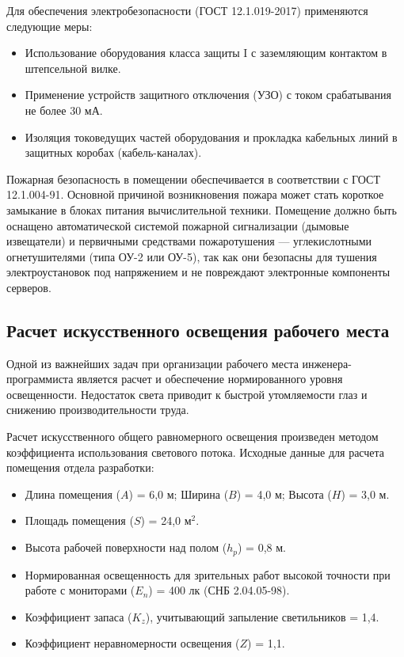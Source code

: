 Для обеспечения электробезопасности (ГОСТ 12.1.019-2017) применяются следующие меры:
\begin{itemize}
    \item Использование оборудования класса защиты I с заземляющим контактом в штепсельной вилке.
    \item Применение устройств защитного отключения (УЗО) с током срабатывания не более 30 мА.
    \item Изоляция токоведущих частей оборудования и прокладка кабельных линий в защитных коробах (кабель-каналах).
\end{itemize}

Пожарная безопасность в помещении обеспечивается в соответствии с ГОСТ 12.1.004-91. Основной причиной возникновения пожара может стать короткое замыкание в блоках питания вычислительной техники. Помещение должно быть оснащено автоматической системой пожарной сигнализации (дымовые извещатели) и первичными средствами пожаротушения --- углекислотными огнетушителями (типа ОУ-2 или ОУ-5), так как они безопасны для тушения электроустановок под напряжением и не повреждают электронные компоненты серверов.

\subsection{Расчет искусственного освещения рабочего места}

Одной из важнейших задач при организации рабочего места инженера-программиста является расчет и обеспечение нормированного уровня освещенности. Недостаток света приводит к быстрой утомляемости глаз и снижению производительности труда.

Расчет искусственного общего равномерного освещения произведен методом коэффициента использования светового потока. Исходные данные для расчета помещения отдела разработки:
\begin{itemize}
    \item Длина помещения ($A$) = 6,0 м; Ширина ($B$) = 4,0 м; Высота ($H$) = 3,0 м.
    \item Площадь помещения ($S$) = 24,0 м$^2$.
    \item Высота рабочей поверхности над полом ($h_p$) = 0,8 м.
    \item Нормированная освещенность для зрительных работ высокой точности при работе с мониторами ($E_n$) = 400 лк (СНБ 2.04.05-98).
    \item Коэффициент запаса ($K_z$), учитывающий запыление светильников = 1,4.
    \item Коэффициент неравномерности освещения ($Z$) = 1,1.
\end{itemize}

